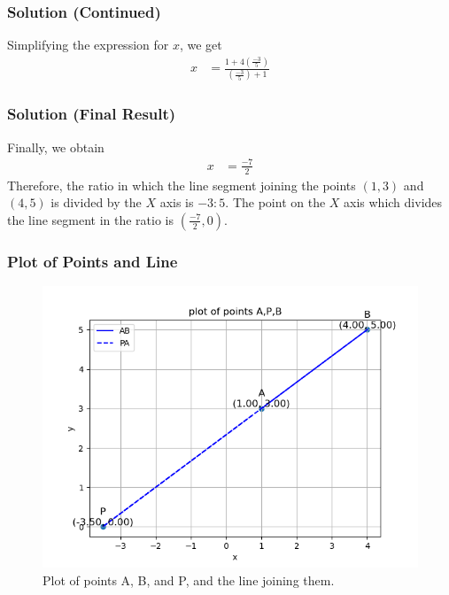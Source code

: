 \documentclass{beamer}
\providecommand{\brak}[1]{\ensuremath{\left(#1\right)}}
\theoremstyle{remark}
\begin{document}
\begin{frame}
\frametitle{Solution (Continued)}
Simplifying the expression for \( x \), we get
\begin{align}
x&=\frac{1+4\brak{\frac{-3}{5}}}{\brak{\frac{-3}{5}}+1}
\end{align}
\end{frame}

\begin{frame}
\frametitle{Solution (Final Result)}
Finally, we obtain
\begin{align}
x&=\frac{-7}{2}
\end{align}
Therefore, the ratio in which the line segment joining the points \brak{1,3} and \brak{4,5} is divided by the $X$ axis is \( -3:5 \). The point on the $X$ axis which divides the line segment in the ratio is \brak{\frac{-7}{2}, 0}.
\end{frame}

\begin{frame}
\frametitle{Plot of Points and Line}
\begin{figure}[h!]
\centering
\includegraphics[width=0.7\columnwidth]{figs/figure.png}    
\caption{Plot of points A, B, and P, and the line joining them.}
\label{Plot of points A,B and P and the line joining them}
\end{figure}
\end{frame}

\end{document}
